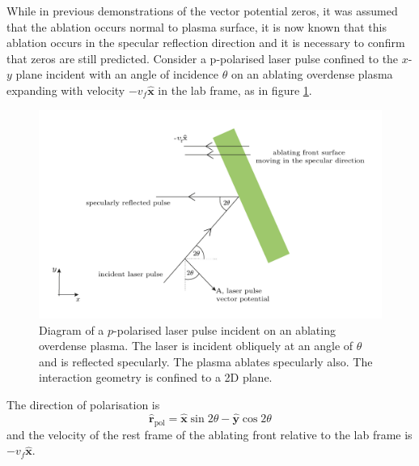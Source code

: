 While in previous demonstrations of the vector potential zeros, it was assumed that the ablation occurs normal to plasma surface, it is now known that this ablation occurs in the specular reflection direction and it is necessary to confirm that zeros are still predicted. Consider a p-polarised laser pulse confined to the $x$-$y$ plane incident with an angle of incidence $\theta$ on an ablating overdense plasma expanding with velocity $-v_f\hat{\mathbf{x}}$ in the lab frame, as in figure \ref{fig:zvp_ablatingfront}.
\begin{figure}
	\centering
	\includegraphics[width=0.7\linewidth]{figures/zvp/zvp_ablating_front}
	\caption[Diagram of a $p$-polarised laser pulse incident on an ablating overdense plasma.]{Diagram of a $p$-polarised laser pulse incident on an ablating overdense plasma. The laser is incident obliquely at an angle of $\theta$ and is reflected specularly. The plasma ablates specularly also. The interaction geometry is confined to a 2D plane.}
	\label{fig:zvp_ablatingfront}
\end{figure}
The direction of polarisation is
\begin{equation}
	\hat{\mathbf{r}}_\mathrm{pol} = \hat{\mathbf{x}}\sin{2\theta} - \hat{\mathbf{y}}\cos{2\theta}
\end{equation}
and the velocity of the rest frame of the ablating front relative to the lab frame is $-v_f\hat{\mathbf{x}}$.

